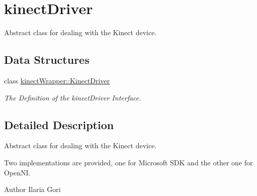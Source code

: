 \section{kinect\+Driver}
\label{group__kinectDriver}


Abstract class for dealing with the Kinect device.  


\subsection*{Data Structures}
\begin{DoxyCompactItemize}
\item 
class \hyperlink{classkinectWrapper_1_1KinectDriver}{kinect\+Wrapper\+::\+Kinect\+Driver}
\begin{DoxyCompactList}\small\item\em The Definition of the kinect\+Driver Interface. \end{DoxyCompactList}\end{DoxyCompactItemize}


\subsection{Detailed Description}
Abstract class for dealing with the Kinect device. 

Two implementations are provided, one for Microsoft S\+DK and the other one for Open\+NI.

\begin{DoxyAuthor}{Author}
Ilaria Gori 
\end{DoxyAuthor}
